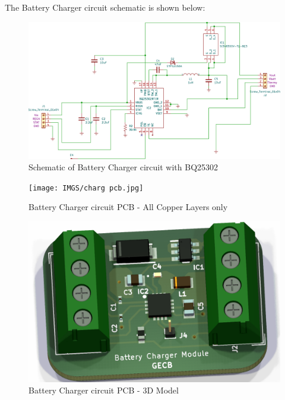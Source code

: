 The Battery Charger circuit schematic is shown below:
\begin{figure}[H]
	\centering
	\includegraphics[width=\columnwidth]{IMGS/charg.pdf}
	\caption{Schematic of Battery Charger circuit with BQ25302}
	\label{fig:battch}
\end{figure}

  \begin{figure}[H]
	\centering
	\texttt{[image: IMGS/charg pcb.jpg]}
	\caption{\centering Battery Charger circuit PCB - All Copper Layers only}
	\label{fig:chargpcb}
\end{figure}
\begin{figure}[H]
	\centering	\includegraphics[width=0.7\columnwidth]{IMGS/charg 3d.png}
	\caption{\centering Battery Charger circuit PCB - 3D Model}
	\label{fig:chargpcb3d}
\end{figure}

 \justifying








